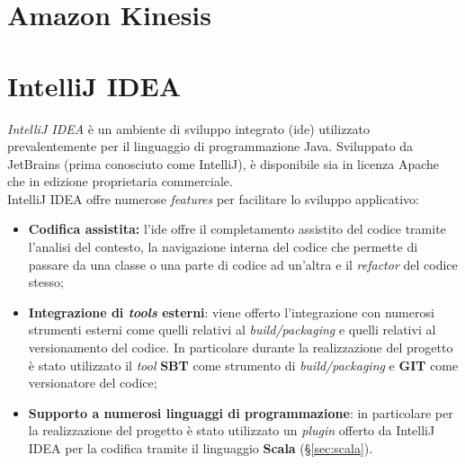 \section{Amazon Kinesis}

\section{IntelliJ IDEA}
\textit{IntelliJ IDEA} è un ambiente di sviluppo integrato (\gls{ide}) utilizzato prevalentemente per il linguaggio di programmazione Java. Sviluppato da JetBrains (prima conosciuto come IntelliJ), è disponibile sia in licenza Apache che in edizione proprietaria commerciale.\\
IntelliJ IDEA offre numerose \textit{features} per facilitare lo sviluppo applicativo:
\begin{itemize}
	\item{\textbf{Codifica assistita:} l'\gls{ide} offre il completamento assistito del codice tramite l'analisi del contesto, la navigazione interna del codice che permette di passare da una classe o una parte di codice ad un'altra e il \textit{refactor} del codice stesso;}
	\item{\textbf{Integrazione di \textit{tools} esterni}: viene offerto l'integrazione con numerosi strumenti esterni come quelli relativi al \textit{build/packaging} e quelli relativi al versionamento del codice. In particolare durante la realizzazione del progetto è stato utilizzato il \textit{tool} \textbf{SBT} come strumento di \textit{build/packaging} e \textbf{GIT} come versionatore del codice;}
	\item{\textbf{Supporto a numerosi linguaggi di programmazione}: in particolare per la realizzazione del progetto è stato utilizzato un \textit{plugin} offerto da IntelliJ IDEA per la codifica tramite il linguaggio \textbf{Scala} (\S\ref{sec:scala}).}
\end{itemize}

